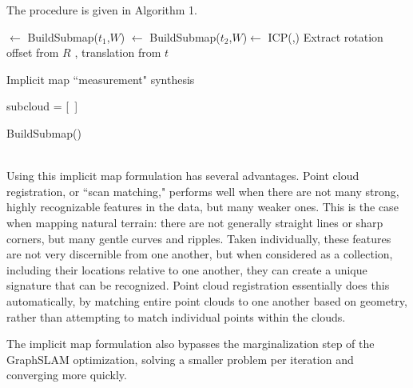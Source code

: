 The procedure is given in Algorithm 1.


\begin{algorithm}[H]
\DontPrintSemicolon
\SetAlgoLined
{}
\MapOne $\leftarrow$ BuildSubmap($t_1$,$W$) \;
\MapTwo $\leftarrow$ BuildSubmap($t_2$,$W$)\;
[$R$, $t$] $\leftarrow$ ICP(\MapOne,\MapTwo)  \;
Extract rotation offset from $R$ , translation from $t$\;
 \caption{Implicit map ``measurement" synthesis}
\end{algorithm} 


\begin{algorithm}[H]
\DontPrintSemicolon
\label{alg.submap}
\SetAlgoLined
{}
subcloud = [~] \;
\caption{BuildSubmap() \label{BSM}}
\end{algorithm}
~\\


Using this implicit map formulation has several advantages. Point cloud registration, or ``scan matching," performs well when there are not many strong, highly recognizable features in the data, but many weaker ones. This is the case when mapping natural terrain: there are not generally straight lines or sharp corners, but many gentle curves and ripples. Taken individually, these features are not very discernible from one another, but when considered as a collection, including their locations relative to one another, they can create a unique signature that can be recognized. Point cloud registration essentially does this automatically, by matching entire point clouds to one another based on geometry, rather than attempting to match individual points within the clouds.

The implicit map formulation also bypasses the marginalization step of the GraphSLAM optimization, solving a smaller problem per iteration and converging more quickly. 

